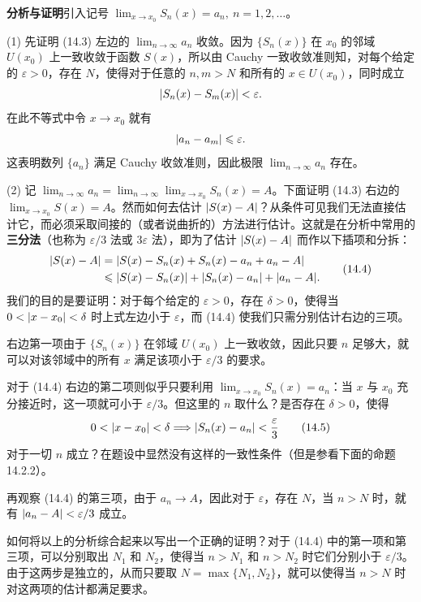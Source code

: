 \textbf{分析与证明}\quad 引入记号 $\displaystyle\lim_{x\to x_0}S_n(x)=a_n,\ n=1,2,\ldots$。

(1) 先证明 (14.3) 左边的 $\displaystyle\lim_{n\to\infty}a_n$ 收敛。因为 $\{S_n(x)\}$ 在 $x_0$ 的邻域 $U(x_0)$ 上一致收敛于函数 $S(x)$，所以由 Cauchy 一致收敛准则知，对每个给定的 $\varepsilon>0$，存在 $N$，使得对于任意的 $n,m>N$ 和所有的 $x\in U(x_0)$，同时成立
\[
  \lvert S_n(x)-S_m(x)\rvert<\varepsilon.
\]
在此不等式中令 $x\to x_0$ 就有
\[
  \lvert a_n-a_m\rvert\leqslant\varepsilon.
\]
这表明数列 $\{a_n\}$ 满足 Cauchy 收敛准则，因此极限 $\displaystyle\lim_{n\to\infty}a_n$ 存在。

(2) 记 $\displaystyle\lim_{n\to\infty}a_n=\lim_{n\to\infty}\lim_{x\to x_0}S_n(x)=A$。下面证明 (14.3) 右边的 $\displaystyle\lim_{x\to x_0}S(x)=A$。然而如何去估计 $\lvert S(x)-A\rvert$？从条件可见我们无法直接估计它，而必须采取间接的（或者说曲折的）方法进行估计。这就是在分析中常用的\textbf{三分法}（也称为 $\varepsilon/3$ 法或 $3\varepsilon$ 法），即为了估计 $\lvert S(x)-A\rvert$ 而作以下插项和分拆：
\begin{equation}
\begin{aligned}
  \lvert S(x)-A\rvert
  &=\lvert S(x)-S_n(x)+S_n(x)-a_n+a_n-A\rvert\\
  &\leqslant\lvert S(x)-S_n(x)\rvert+\lvert S_n(x)-a_n\rvert+\lvert a_n-A\rvert.
\end{aligned}
\tag{14.4}
\label{eq:14.4}
\end{equation}
我们的目的是要证明：对于每个给定的 $\varepsilon>0$，存在 $\delta>0$，使得当 $0<\lvert x-x_0\rvert<\delta$ 时上式左边小于 $\varepsilon$，而 (14.4) 使我们只需分别估计右边的三项。

右边第一项由于 $\{S_n(x)\}$ 在邻域 $U(x_0)$ 上一致收敛，因此只要 $n$ 足够大，就可以对该邻域中的所有 $x$ 满足该项小于 $\varepsilon/3$ 的要求。

对于 (14.4) 右边的第二项则似乎只要利用 $\displaystyle\lim_{x\to x_0}S_n(x)=a_n$：当 $x$ 与 $x_0$ 充分接近时，这一项就可小于 $\varepsilon/3$。但这里的 $n$ 取什么？是否存在 $\delta>0$，使得
\begin{equation}
  0<\lvert x-x_0\rvert<\delta\Longrightarrow\lvert S_n(x)-a_n\rvert<\frac\varepsilon3
  \tag{14.5}
  \label{eq:14.5}
\end{equation}
对于一切 $n$ 成立？在题设中显然没有这样的一致性条件（但是参看下面的命题 14.2.2）。

再观察 (14.4) 的第三项，由于 $a_n\to A$，因此对于 $\varepsilon$，存在 $N$，当 $n>N$ 时，就有 $\lvert a_n-A\rvert<\varepsilon/3$ 成立。

如何将以上的分析综合起来以写出一个正确的证明？对于 (14.4) 中的第一项和第三项，可以分别取出 $N_1$ 和 $N_2$，使得当 $n>N_1$ 和 $n>N_2$ 时它们分别小于 $\varepsilon/3$。由于这两步是独立的，从而只要取 $N=\max\{N_1,N_2\}$，就可以使得当 $n>N$ 时对这两项的估计都满足要求。

